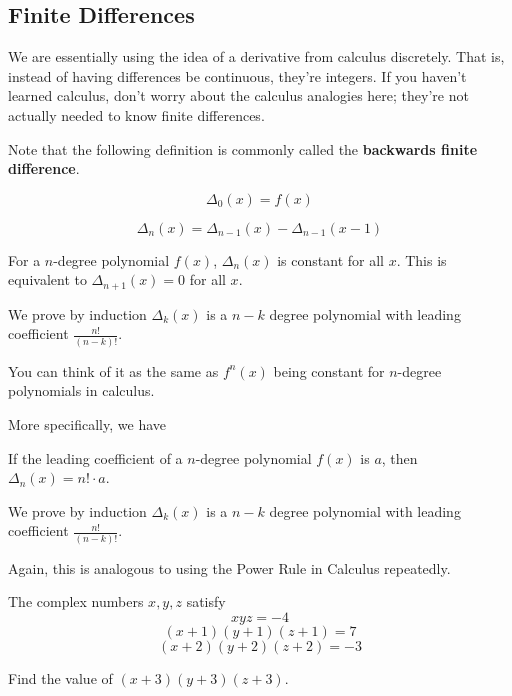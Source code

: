\documentclass[mast]{lucky}
\begin{document}
\subsection{Finite Differences}

We are essentially using the idea of a derivative from calculus discretely. That is, instead of having differences be continuous, they're integers. If you haven't learned calculus, don't worry about the calculus analogies here; they're not actually needed to know finite differences.

Note that the following definition is commonly called the \textbf{backwards finite difference}. 

\begin{defi}
$$\Delta_{0} (x)=f(x)$$

$$\Delta_{n} (x) = \Delta_{n-1} (x) - \Delta_{n-1} (x-1)$$
\end{defi}

\begin{theo}
For a $n$-degree polynomial $f(x)$, $\Delta_{n}(x)$ is constant for all $x$. This is equivalent to $\Delta_{n+1}(x)=0$ for all $x$.
\end{theo}

\begin{pro}
We prove by induction $\Delta_{k}(x)$ is a $n-k$ degree polynomial with leading coefficient $\frac{n!}{(n-k)!}$.
\end{pro}

You can think of it as the same as $f^{n}(x)$ being constant for $n$-degree polynomials in calculus.

More specifically, we have
\begin{theo}
If the leading coefficient of a $n$-degree polynomial $f(x)$ is $a$, then $\Delta_{n}(x)=n!\cdot a$.
\end{theo}

\begin{pro}
We prove by induction $\Delta_{k}(x)$ is a $n-k$ degree polynomial with leading coefficient $\frac{n!}{(n-k)!}$.
\end{pro}

Again, this is analogous to using the Power Rule in Calculus repeatedly.

\begin{exam}
The complex numbers $x, y, z$ satisfy
$$xyz = -4$$
$$(x + 1)(y + 1)(z + 1) = 7$$
$$(x + 2)(y + 2)(z + 2) = -3$$

Find the value of $(x + 3)(y + 3)(z + 3)$.
\end{exam}
\end{document}

